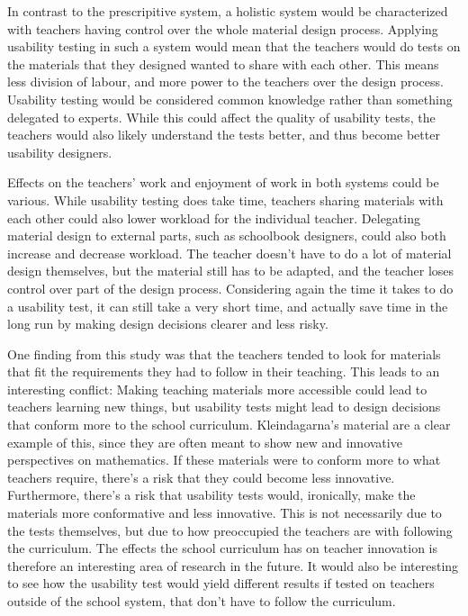 In contrast to the prescripitive system, a holistic system would be characterized with teachers having control over the whole material design process. Applying usability testing in such a system would mean that the teachers would do tests on the materials that they designed wanted to share with each other. This means less division of labour, and more power to the teachers over the design process. Usability testing would be considered common knowledge rather than something delegated to experts. While this could affect the quality of usability tests, the teachers would also likely understand the tests better, and thus become better usability designers.

Effects on the teachers' work and enjoyment of work in both systems could be various. While usability testing does take time, teachers sharing materials with each other could also lower workload for the individual teacher. Delegating material design to external parts, such as schoolbook designers, could also both increase and decrease workload. The teacher doesn't have to do a lot of material design themselves, but the material still has to be adapted, and the teacher loses control over part of the design process. Considering again the time it takes to do a usability test, it can still take a very short time, and actually save time in the long run by making design decisions clearer and less risky.

One finding from this study was that the teachers tended to look for materials that fit the requirements they had to follow in their teaching. This leads to an interesting conflict: Making teaching materials more accessible could lead to teachers learning new things, but usability tests might lead to design decisions that conform more to the school curriculum. Kleindagarna's material are a clear example of this, since they are often meant to show new and innovative perspectives on mathematics. If these materials were to conform more to what teachers require, there's a risk that they could become less innovative. Furthermore, there's a risk that usability tests would, ironically, make the materials more conformative and less innovative. This is not necessarily due to the tests themselves, but due to how preoccupied the teachers are with following the curriculum. The effects the school curriculum has on teacher innovation is therefore an interesting area of research in the future. It would also be interesting to see how the usability test would yield different results if tested on teachers outside of the school system, that don't have to follow the curriculum.

